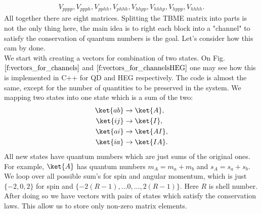 \begin{align}
V_{pppp},V_{ppph}, V_{pphh}, V_{phhh},V_{hhpp},V_{hhhp},V_{hppp},V_{hhhh}.
\end{align}
All together there are eight matrices. Splitting the TBME matrix into parts is not the only thing here, the main idea is to right each block into a "channel" to satisfy the conservation of quantum numbers is the goal. Let's consider how this cam by done.\\
We start with creating a vectors for combination of two states. On Fig. $\ref{f:vectors_for_channels}$ and $\ref{f:vectors_for_channelsHEG}$ one may see how this is implemented in C++ for QD and HEG respectively. The code is almost the same, except for the number of quantities to be preserved in the system. We mapping two states into one state which is a sum of the two:
\begin{align}
\ket{ab} &\rightarrow \ket{A}, \\
\ket{ij} &\rightarrow \ket{I}, \\
\ket{ai} &\rightarrow \ket{AI}, \\
\ket{ia} &\rightarrow \ket{IA}. \\
\end{align}
All new states have quantum numbers which are just sums of the original ones. For example, $\ket{A}$ has quantum numbers $m_A = m_a+m_b$ and  $s_A = s_a+s_b$. We loop over all possible sum's for spin and angular momentum, which is just $\{-2,0,2\}$ for spin and $\{-2(R-1), \dots 0, \dots , 2(R-1)\}$. Here $R$ is shell number. After doing so we have vectors with pairs of states which satisfy the conservation laws. This allow us to store only non-zero matrix elements.\\


